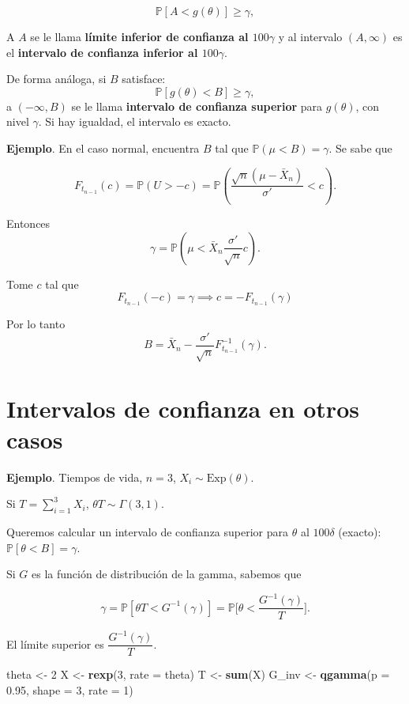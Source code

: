 \documentclass[
  12pt,
]{book}
\newenvironment{Shaded}{\begin{snugshade}}{\end{snugshade}}
\newcommand{\DataTypeTok}[1]{\textcolor[rgb]{0.13,0.29,0.53}{#1}}
\newcommand{\DecValTok}[1]{\textcolor[rgb]{0.00,0.00,0.81}{#1}}
\newcommand{\FloatTok}[1]{\textcolor[rgb]{0.00,0.00,0.81}{#1}}
\newcommand{\KeywordTok}[1]{\textcolor[rgb]{0.13,0.29,0.53}{\textbf{#1}}}
\newcommand{\NormalTok}[1]{#1}
\newcommand{\StringTok}[1]{\textcolor[rgb]{0.31,0.60,0.02}{#1}}
\begin{document}
\[\mathbb P [A<g(\theta)]\geq \gamma,\]

A \(A\) se le llama \textbf{límite inferior de confianza al \(100\gamma\)} y al intervalo
\((A,\infty)\) es el \textbf{intervalo de confianza inferior al \(100\gamma\)}.

De forma análoga, si \(B\) satisface:
\[\mathbb P [g(\theta)<B]\geq \gamma,\]
a \((-\infty,B)\) se le
llama \textbf{intervalo de confianza superior} para \(g(\theta)\), con nivel \(\gamma\). Si
hay igualdad, el intervalo es exacto.

\textbf{Ejemplo}. En el caso normal, encuentra \(B\) tal que \(\mathbb P(\mu<B) = \gamma\).
Se sabe que

\[F_{t_{n-1}}(c) = \mathbb P(U>-c) = \mathbb P \left(\dfrac{\sqrt n(\mu - \bar
X_n)}{\sigma'}<c\right).\]

Entonces
\[\gamma = \mathbb P\left(\mu < \bar X_n\dfrac{\sigma'}{\sqrt n}c\right).\]

Tome \(c\) tal que
\[F_{t_{n-1}}(-c) = \gamma \implies c = -F_{t_{n-1}}(\gamma)\]

Por lo tanto
\[B = \bar X_n - \dfrac{\sigma'}{\sqrt{n}}F^{-1}_{t_{n-1}}(\gamma).\]

\hypertarget{intervalos-de-confianza-en-otros-casos}{%
\section{Intervalos de confianza en otros casos}\label{intervalos-de-confianza-en-otros-casos}}

\textbf{Ejemplo}. Tiempos de vida, \(n=3\), \(X_i\sim \text{Exp}(\theta)\).

Si \(T = \sum_{i=1}^3X_i\), \(\theta T\sim \Gamma(3,1)\).

Queremos calcular un intervalo de confianza superior para \(\theta\) al
\(100\delta\) (exacto): \(\mathbb P[\theta<B] = \gamma\).

Si \(G\) es la función de distribución de la gamma, sabemos que

\begin{equation*}
\gamma = \mathbb{P}[\theta T<G^{-1}(\gamma)] = \mathbb{P}\bigg[\theta<\dfrac{G^{-1}(\gamma)}{T}\bigg].
\end{equation*}

El límite superior es \(\dfrac{G^{-1}(\gamma)}{T}\).

\begin{Shaded}
\begin{Highlighting}[]
\NormalTok{theta \textless{}{-}}\StringTok{ }\DecValTok{2}
\NormalTok{X \textless{}{-}}\StringTok{ }\KeywordTok{rexp}\NormalTok{(}\DecValTok{3}\NormalTok{, }\DataTypeTok{rate =}\NormalTok{ theta)}
\NormalTok{T \textless{}{-}}\StringTok{ }\KeywordTok{sum}\NormalTok{(X)}
\NormalTok{G\_inv \textless{}{-}}\StringTok{ }\KeywordTok{qgamma}\NormalTok{(}\DataTypeTok{p =} \FloatTok{0.95}\NormalTok{, }\DataTypeTok{shape =} \DecValTok{3}\NormalTok{, }\DataTypeTok{rate =} \DecValTok{1}\NormalTok{)}
\end{Highlighting}
\end{Shaded}
\end{document}
